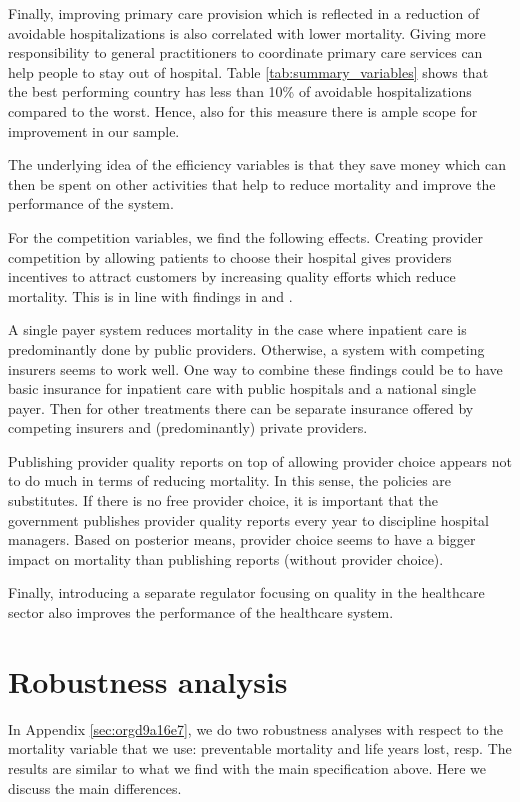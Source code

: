 \documentclass[a4paper,12pt]{article}
\begin{document}
Finally, improving primary care provision which is reflected in a reduction of avoidable hospitalizations is also correlated with lower mortality. Giving more responsibility to general practitioners to coordinate primary care services can help people to stay out of hospital. Table \ref{tab:summary_variables} shows that the best performing country has less than 10\% of avoidable hospitalizations compared to the worst. Hence, also for this measure there is ample scope for improvement in our sample. 

The underlying idea of the efficiency variables is that they save money which can then be spent on other activities that help to reduce mortality and improve the performance of the system.

For the competition variables, we find the following effects. Creating provider competition by allowing patients to choose their hospital gives providers incentives to attract customers by increasing quality efforts which reduce mortality. This is in line with findings in \cite{NBERw19800} and \cite{teisberg}.

A single payer system reduces mortality in the case where inpatient care is predominantly done by public providers. Otherwise, a system with competing insurers seems to work well. One way to combine these findings could be to have basic insurance for inpatient care with public hospitals and a national single payer. Then for other treatments there can be separate insurance offered by competing insurers and (predominantly) private providers.

Publishing provider quality reports on top of allowing provider choice appears not to do much in terms of reducing mortality. In this sense, the policies are substitutes. If there is no free provider choice, it is important that the government publishes provider quality reports every year to discipline hospital managers. Based on posterior means, provider choice seems to have a bigger impact on mortality than publishing reports (without provider choice).

Finally, introducing a separate regulator focusing on quality in the healthcare sector also improves the performance of the healthcare system.

\section{Robustness analysis}
\label{sec:org180ed5e}

In Appendix \ref{sec:orgd9a16e7}, we do two robustness analyses with respect to the mortality variable that we use: preventable mortality and  life years lost, resp. The results are similar to what we find with the main specification above. Here we discuss the main differences.
\end{document}
